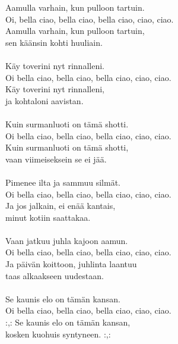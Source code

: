 
            Aamulla varhain, kun pulloon tartuin. \\
            Oi, bella ciao, bella ciao, bella ciao, ciao, ciao. \\
            Aamulla varhain, kun pulloon tartuin, \\
            sen käänsin kohti huuliain. \\
\hspace{10mm} \\
            Käy toverini nyt rinnalleni. \\
            Oi bella ciao, bella ciao, bella ciao, ciao, ciao. \\
            Käy toverini nyt rinnalleni, \\
            ja kohtaloni aavistan. \\
\hspace{10mm} \\
            Kuin surmanluoti on tämä shotti. \\
            Oi bella ciao, bella ciao, bella ciao, ciao, ciao. \\
            Kuin surmanluoti on tämä shotti, \\
            vaan viimeiseksein se ei jää. \\
\hspace{10mm} \\
            Pimenee ilta ja sammuu silmät. \\
            Oi bella ciao, bella ciao, bella ciao, ciao, ciao. \\
            Ja jos jalkain, ei enää kantais, \\
            minut kotiin saattakaa. \\
\hspace{10mm} \\
            Vaan jatkuu juhla kajoon aamun. \\
            Oi bella ciao, bella ciao, bella ciao, ciao, ciao. \\
            Ja päivän koittoon, juhlinta laantuu \\
            taas alkaakseen uudestaan. \\
\hspace{10mm} \\
            Se kaunis elo on tämän kansan. \\
            Oi bella ciao, bella ciao, bella ciao, ciao, ciao. \\
            :,: Se kaunis elo on tämän kansan, \\
            kosken kuohuis syntyneen. :,: \\
